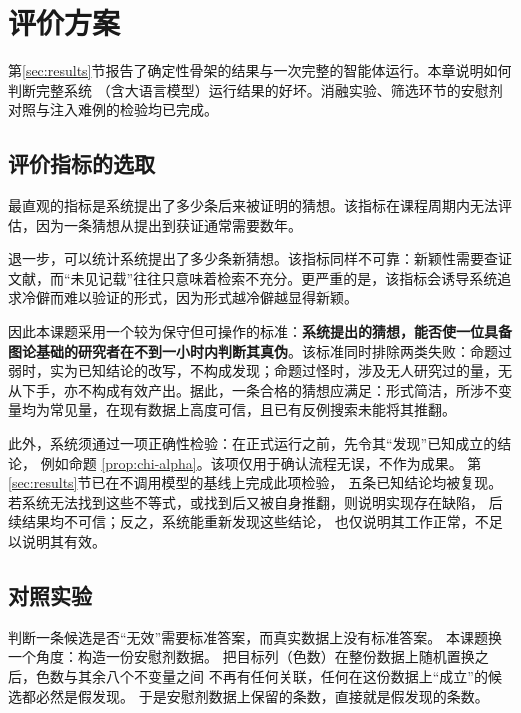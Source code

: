 
\section{评价方案}
\label{sec:evaluation}

第\ref{sec:results}节报告了确定性骨架的结果与一次完整的智能体运行。本章说明如何判断完整系统
（含大语言模型）运行结果的好坏。消融实验、筛选环节的安慰剂对照与注入难例的检验均已完成。

\subsection{评价指标的选取}

最直观的指标是系统提出了多少条后来被证明的猜想。该指标在课程周期内无法评估，因为一条猜想从提出到获证通常需要数年。

退一步，可以统计系统提出了多少条新猜想。该指标同样不可靠：新颖性需要查证文献，而“未见记载”往往只意味着检索不充分。更严重的是，该指标会诱导系统追求冷僻而难以验证的形式，因为形式越冷僻越显得新颖。

因此本课题采用一个较为保守但可操作的标准：\textbf{系统提出的猜想，能否使一位具备图论基础的研究者在不到一小时内判断其真伪}。该标准同时排除两类失败：命题过弱时，实为已知结论的改写，不构成发现；命题过怪时，涉及无人研究过的量，无从下手，亦不构成有效产出。据此，一条合格的猜想应满足：形式简洁，所涉不变量均为常见量，在现有数据上高度可信，且已有反例搜索未能将其推翻。

此外，系统须通过一项正确性检验：在正式运行之前，先令其“发现”已知成立的结论，
例如命题 \ref{prop:chi-alpha}。该项仅用于确认流程无误，不作为成果。
第\ref{sec:results}节已在不调用模型的基线上完成此项检验，
五条已知结论均被复现。
若系统无法找到这些不等式，或找到后又被自身推翻，则说明实现存在缺陷，
后续结果均不可信；反之，系统能重新发现这些结论，
也仅说明其工作正常，不足以说明其有效。

\subsection{对照实验}

判断一条候选是否“无效”需要标准答案，而真实数据上没有标准答案。
本课题换一个角度：构造一份安慰剂数据。
把目标列（色数）在整份数据上随机置换之后，色数与其余八个不变量之间
不再有任何关联，任何在这份数据上“成立”的候选都必然是假发现。
于是安慰剂数据上保留的条数，直接就是假发现的条数。

